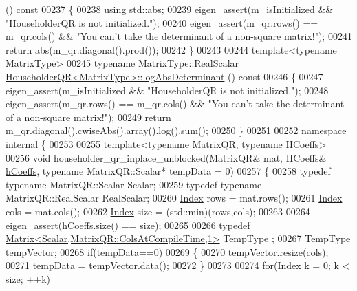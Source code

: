 \begin{DoxyCode}
      ()\textcolor{keyword}{ const}
00237 \textcolor{keyword}{}\{
00238   \textcolor{keyword}{using} std::abs;
00239   eigen\_assert(m\_isInitialized && \textcolor{stringliteral}{"HouseholderQR is not initialized."});
00240   eigen\_assert(m\_qr.rows() == m\_qr.cols() && \textcolor{stringliteral}{"You can't take the determinant of a non-square matrix!"});
00241   \textcolor{keywordflow}{return} abs(m\_qr.diagonal().prod());
00242 \}
00243 
00244 \textcolor{keyword}{template}<\textcolor{keyword}{typename} MatrixType>
00245 \textcolor{keyword}{typename} MatrixType::RealScalar \hyperlink{group___q_r___module_af61b6dbef34fc51c825182b16dc43ca1}{HouseholderQR<MatrixType>::logAbsDeterminant}
      ()\textcolor{keyword}{ const}
00246 \textcolor{keyword}{}\{
00247   eigen\_assert(m\_isInitialized && \textcolor{stringliteral}{"HouseholderQR is not initialized."});
00248   eigen\_assert(m\_qr.rows() == m\_qr.cols() && \textcolor{stringliteral}{"You can't take the determinant of a non-square matrix!"});
00249   \textcolor{keywordflow}{return} m\_qr.diagonal().cwiseAbs().array().log().sum();
00250 \}
00251 
00252 \textcolor{keyword}{namespace }\hyperlink{namespaceinternal}{internal} \{
00253 
00255 \textcolor{keyword}{template}<\textcolor{keyword}{typename} MatrixQR, \textcolor{keyword}{typename} HCoeffs>
00256 \textcolor{keywordtype}{void} householder\_qr\_inplace\_unblocked(MatrixQR& mat, HCoeffs& \hyperlink{group___q_r___module_ae931aa44cde62317b57a9ae661d184be}{hCoeffs}, \textcolor{keyword}{typename} MatrixQR::Scalar* 
      tempData = 0)
00257 \{
00258   \textcolor{keyword}{typedef} \textcolor{keyword}{typename} MatrixQR::Scalar Scalar;
00259   \textcolor{keyword}{typedef} \textcolor{keyword}{typename} MatrixQR::RealScalar RealScalar;
00260   \hyperlink{namespace_eigen_a62e77e0933482dafde8fe197d9a2cfde}{Index} rows = mat.rows();
00261   \hyperlink{namespace_eigen_a62e77e0933482dafde8fe197d9a2cfde}{Index} cols = mat.cols();
00262   \hyperlink{namespace_eigen_a62e77e0933482dafde8fe197d9a2cfde}{Index} size = (std::min)(rows,cols);
00263 
00264   eigen\_assert(hCoeffs.size() == size);
00265 
00266   \textcolor{keyword}{typedef} \hyperlink{group___core___module_class_eigen_1_1_matrix}{Matrix<Scalar,MatrixQR::ColsAtCompileTime,1>} TempType
      ;
00267   TempType tempVector;
00268   \textcolor{keywordflow}{if}(tempData==0)
00269   \{
00270     tempVector.\hyperlink{class_eigen_1_1_plain_object_base_a99d9054ee2d5a40c6e00ded0265e9cea}{resize}(cols);
00271     tempData = tempVector.data();
00272   \}
00273 
00274   \textcolor{keywordflow}{for}(\hyperlink{namespace_eigen_a62e77e0933482dafde8fe197d9a2cfde}{Index} k = 0; k < size; ++k)

\end{DoxyCode}
